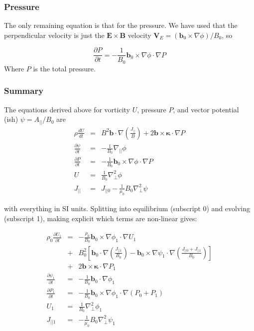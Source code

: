 \documentclass[12pt, a4paper]{article}
\newcommand{\deriv}[2]{\ensuremath{\frac{\partial #1}{\partial #2}}}
\newcommand{\apar}{\ensuremath{A_{||}}}
\newcommand{\Vec}[1]{\ensuremath{\mathbf{#1}}}
\newcommand{\bvec}{\Vec{b}}
\newcommand{\kvec}{\Vec{\kappa}}
\newcommand{\bxk}{\bvec\times\kvec\cdot\nabla}
\newcommand{\Jpar}{J_{||}}
\newcommand{\delp}{\nabla_\perp^2}
\begin{document}
\subsubsection{Pressure}

The only remaining equation is that for the pressure. We have used that the perpendicular velocity
is just the $\Vec{E\times B}$ velocity $\Vec{V}_E = \left(\bvec_0\times\nabla\phi\right) / B_0$, so 

\begin{equation}
\deriv{P}{t} = -\frac{1}{B_0}\bvec_0\times\nabla\phi\cdot\nabla P
\end{equation}
Where $P$ is the total pressure.

\subsubsection{Summary}
\label{sec:eqsummary}

The equations derived above for vorticity $U$, pressure $P$, and vector potential (ish) $\psi = \apar / B_0 $ are
\begin{eqnarray*}
\rho \frac{dU}{dt} &=& B^2\bvec\cdot\nabla\left(\frac{\Jpar}{B}\right) + 2\bxk P \\
\deriv{\psi}{t} &=& -\frac{1}{B_0}\nabla_{||}\phi \\
\deriv{P}{t} &=& -\frac{1}{B_0}\bvec_0\times\nabla\phi\cdot\nabla P \\
U &=& \frac{1}{B_0}\delp\phi \\
\Jpar &=& J_{||0} - \frac{1}{\mu_0}B_0\delp\psi 
\end{eqnarray*}

with everything in SI units. Splitting into equilibrium (subscript 0) and evolving (subscript 1), 
making explicit which terms are non-linear gives:

\begin{eqnarray}
\rho_0 \deriv{U_1}{t} &=& - \frac{\rho_0}{B_0}\bvec_0\times\nabla\phi_1\cdot\nabla U_1 \nonumber \\
&+& B_0^2\left[\bvec_0\cdot\nabla\left(\frac{J_{||1}}{B_0}\right) - \bvec_0\times\nabla\psi_1\cdot\nabla\left(\frac{J_{||0} + J_{||1}}{B_0}\right)\right] \nonumber \\
&+& 2\bxk P_1 \\
\deriv{\psi_1}{t} &=& -\frac{1}{B_0}\bvec_0\cdot\nabla\phi_1 \\
\deriv{P_1}{t} &=& -\frac{1}{B_0}\bvec_0\times\nabla\phi_1\cdot\nabla\left(P_0 + P_1\right) \\
U_1 &=& \frac{1}{B_0}\delp\phi_1 \\
J_{||1} &=& -\frac{1}{\mu_0}B_0\delp\psi_1
\end{eqnarray}
\end{document}

